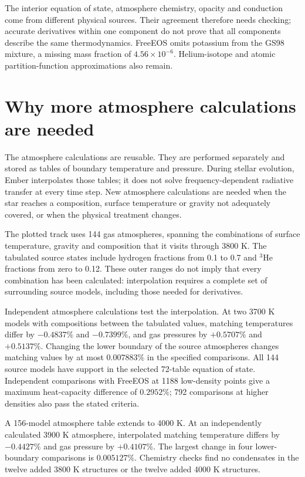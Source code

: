 \documentclass[11pt,letterpaper]{article}
\begin{document}
The interior equation of state, atmosphere chemistry, opacity and conduction
come from different physical sources. Their agreement therefore needs checking;
accurate derivatives within one component do not prove that all components
describe the same thermodynamics. FreeEOS omits potassium from the GS98 mixture,
a missing mass fraction of $4.56\times10^{-6}$. Helium-isotope and atomic
partition-function approximations also remain.

\section{Why more atmosphere calculations are needed}
The atmosphere calculations are reusable. They are performed
separately and stored as tables of boundary temperature and pressure. During
stellar evolution, Ember interpolates those tables; it does not solve
frequency-dependent radiative transfer at every time step. New atmosphere
calculations are needed when the star reaches a composition, surface
temperature or gravity not adequately covered, or when the physical treatment
changes.

The plotted track uses 144 gas atmospheres, spanning the combinations of
surface temperature, gravity and composition that it visits through 3800 K.
The tabulated source states include hydrogen fractions from 0.1 to 0.7 and
$^3$He fractions from zero to 0.12. These outer ranges do not imply that every
combination has been calculated: interpolation requires a complete set of
surrounding source models, including those needed for derivatives.

Independent atmosphere calculations test the interpolation. At two 3700 K
models with compositions between the tabulated values, matching temperatures
differ by $-0.4837\%$ and $-0.7399\%$, and gas pressures by $+0.5707\%$
and $+0.5137\%$. Changing the lower boundary of the source atmospheres
changes matching values by at most $0.007883\%$ in the specified comparisons.
All 144 source models have support in the selected 72-table equation of state.
Independent comparisons with FreeEOS at 1188 low-density points give a maximum
heat-capacity difference of $0.2952\%$; 792 comparisons at higher densities
also pass the stated criteria.

A 156-model atmosphere table extends to
4000 K. At an independently calculated 3900 K atmosphere, interpolated matching
temperature differs by $-0.4427\%$ and gas pressure by $+0.4107\%$.
The largest change in four lower-boundary comparisons is $0.005127\%$.
Chemistry checks find no condensates in the twelve added 3800 K structures
or the twelve added 4000 K structures.
\end{document}
